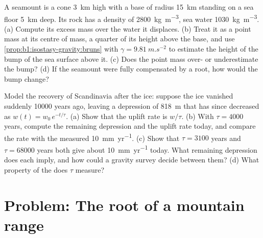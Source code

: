 \begin{exercise}[$\star\star\star$]\label{exo:b1:isostasy-gravity:11}
A seamount is a cone \qty{3}{km} high with a base of radius \qty{15}{km}
standing on a sea floor \qty{5}{km} deep. Its rock has a density of
\qty{2800}{kg.m^{-3}}, sea water \qty{1030}{kg.m^{-3}}. (a) Compute its excess
mass over the water it displaces. (b) Treat it as a point mass at its centre of
mass, a quarter of its height above the base, and use
\cref{prop:b1:isostasy-gravity:bruns} with $\gamma = \qty{9.81}{m.s^{-2}}$ to
estimate the height of the bump of the sea surface above it. (c) Does the point
mass over- or underestimate the bump? (d) If the seamount were fully
compensated by a root, how would the bump change?
\end{exercise}

\begin{exercise}[$\star\star\star$]\label{exo:b1:isostasy-gravity:12}
Model the recovery of Scandinavia after the ice: suppose the ice vanished
suddenly \num{10000} years ago, leaving a depression of \qty{818}{m} that has
since decreased as $w(t) = w_0\,e^{-t/\tau}$. (a) Show that the uplift rate is
$w/\tau$. (b) With $\tau = \num{4000}$ years, compute the remaining depression
and the uplift rate today, and compare the rate with the measured
\qty{10}{mm.yr^{-1}}. (c) Show that $\tau = \num{3100}$ years and
$\tau = \num{68000}$ years both give about \qty{10}{mm.yr^{-1}} today. What
remaining depression does each imply, and how could a gravity survey decide
between them? (d) What property of the  does $\tau$ measure?
\end{exercise}

\section{Problem: The root of a mountain range}

